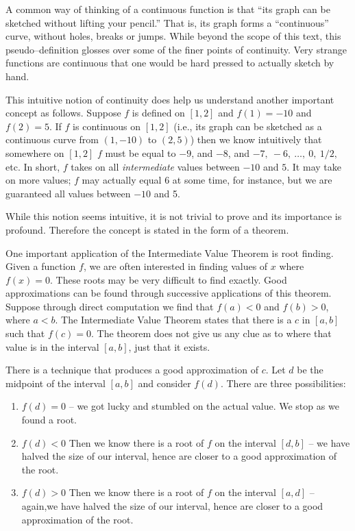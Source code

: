 A common way of thinking of a continuous function is that ``its graph can be sketched without lifting your pencil.'' That is, its graph forms a ``continuous'' curve, without holes, breaks or jumps. 
While beyond the scope of this text, this pseudo--definition glosses over some of the finer points of continuity. Very strange functions are continuous that one would be hard pressed to actually sketch by hand. 

This intuitive notion of continuity does help us understand another important concept as follows. Suppose $f$ is defined on $[1,2]$ and $f(1) = -10$ and $f(2) = 5$. If $f$ is continuous on $[1,2]$ (i.e., its graph can be sketched as a continuous curve from $(1,-10)$ to $(2,5)$) then we know intuitively that somewhere on $[1,2]$ $f$ must be equal to $-9$, and $-8$, and $-7,\ -6,\ \ldots,\ 0,\ 1/2,$ etc. In short, $f$ takes on all \textit{intermediate} values between $-10$ and $5$. It may take on more values; $f$ may actually equal 6 at some time, for instance, but we are guaranteed all values between $-10$ and 5. 

While this notion seems intuitive, it is not trivial to prove and its importance is profound. Therefore the concept is stated in the form of a theorem.


One important application of the Intermediate Value Theorem is root finding. Given a function $f$, we are often interested in finding values of $x$ where $f(x) = 0$. These roots may be very difficult to find exactly. Good approximations can be found through successive applications of this theorem. Suppose through direct computation we find that $f(a) <0 $ and $f(b)>0$, where $a<b$. The Intermediate Value Theorem states that there is a $c$ in $[a,b]$ such that $f(c) = 0$. The theorem does not give us any clue as to where that value is in the interval $[a,b]$, just that it exists. 

There is a technique that produces a good approximation of $c$. Let $d$ be the midpoint of the interval $[a,b]$ and consider $f(d)$. There are three possibilities:
	\begin{enumerate} 
	\item		$f(d) = 0$ -- we got lucky and stumbled on the actual value. We stop as we found a root.
	\item		$f(d) <0$ Then we know there is a root of $f$ on the interval $[d,b]$ -- we have halved the size of our interval, hence are closer to a good approximation of the root.
	\item		$f(d) >0$ Then we know there is a root of $f$ on the interval $[a,d]$ -- again,we have halved the size of our interval, hence are closer to a good approximation of the root.
	\end{enumerate}

